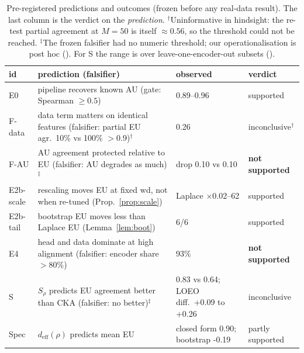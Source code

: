 \begin{table}[t]
\centering
\caption{Pre-registered predictions and outcomes (frozen before any real-data result). The last column is the verdict on the \emph{prediction}. $^\dagger$Uninformative in hindsight: the re-test partial agreement at $M=50$ is itself $\approx0.56$, so the threshold could not be reached. $^\ddagger$The frozen falsifier had no numeric threshold; our operationalisation is post hoc (). For S the range is over leave-one-encoder-out subsets ().}
\label{tab:prereg}
\setlength{\tabcolsep}{3pt}
\small
\begin{tabular}{l p{7.4cm} p{4.6cm} p{2.6cm}}
\toprule
id & prediction (falsifier) & observed & verdict \\
\midrule
E0 & pipeline recovers known AU (gate: Spearman $\ge0.5$) & 0.89--0.96 & supported \\
F-data & data term matters on identical features (falsifier: partial EU agr.\ 10\% vs 100\% $>0.9$)$^\dagger$ & 0.26 & inconclusive$^\dagger$ \\
F-AU & AU agreement protected relative to EU (falsifier: AU degrades as much)$^\ddagger$ & drop 0.10 vs 0.10 & \textbf{not supported} \\
E2b-scale & rescaling moves EU at fixed wd, not when re-tuned (Prop.~\ref{prop:scale}) & Laplace $\times$0.02--62 & supported \\
E2b-tail & bootstrap EU moves less than Laplace EU (Lemma~\ref{lem:boot}) & 6/6 & supported \\
E4 & head and data dominate at high alignment (falsifier: encoder share $>80\%$) & 93\% & \textbf{not supported} \\
S & $S_\rho$ predicts EU agreement better than CKA (falsifier: no better)$^\ddagger$ & 0.83 vs 0.64; LOEO diff.\ +0.09 to +0.26 & inconclusive \\
Spec & $d_{\mathrm{eff}}(\rho)$ predicts mean EU & closed form 0.90; bootstrap -0.19 & partly supported \\
\bottomrule
\end{tabular}
\end{table}